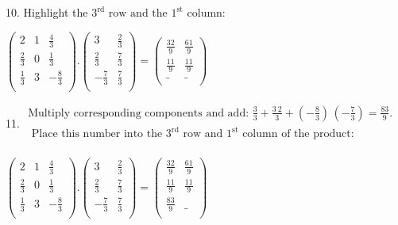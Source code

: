 \documentclass{article}
\begin{document}
10. Highlight the $3^{\text{rd}}\text{ row and the }1^{\text{st}}$ column:

$\left(
        \begin{array}{ccc}
2           & 1 & \frac{4}{3}  \\
                \frac{2}{3} & 0 & \frac{1}{3}  \\
                \frac{1}{3} & 3 & -\frac{8}{3} \\
            \end{array}
        \right).\left(
        \begin{array}{cc}
3            & \frac{2}{3} \\
                \frac{2}{3}  & \frac{7}{3} \\
                -\frac{7}{3} & \frac{7}{3} \\
            \end{array}
        \right)=\left(
        \begin{array}{cc}
\frac{32}{9} & \frac{61}{9} \\
                \frac{11}{9} & \frac{11}{9} \\
                \_           & \_           \\
            \end{array}
        \right)$

11. $\begin{array}{l}
\text{Multiply corresponding components and add: }\frac{3}{3}+\frac{3\ 2}{3}+\left(-\frac{8}{3}\right)\, \left(-\frac{7}{3}\right)=\frac{83}{9}. \\
\text{            Place this number into the }3^{\text{rd}}\text{ row and }1^{\text{st}}\text{ column of the product}:           \\
        \end{array}$

$\left(
        \begin{array}{ccc}
2           & 1 & \frac{4}{3}  \\
                \frac{2}{3} & 0 & \frac{1}{3}  \\
                \frac{1}{3} & 3 & -\frac{8}{3} \\
            \end{array}
        \right).\left(
        \begin{array}{cc}
3            & \frac{2}{3} \\
                \frac{2}{3}  & \frac{7}{3} \\
                -\frac{7}{3} & \frac{7}{3} \\
            \end{array}
        \right)=\left(
        \begin{array}{cc}
\frac{32}{9}          & \frac{61}{9} \\
                \frac{11}{9}          & \frac{11}{9} \\
                \frac{83}{9} & \_           \\
            \end{array}
        \right)$
\end{document}
